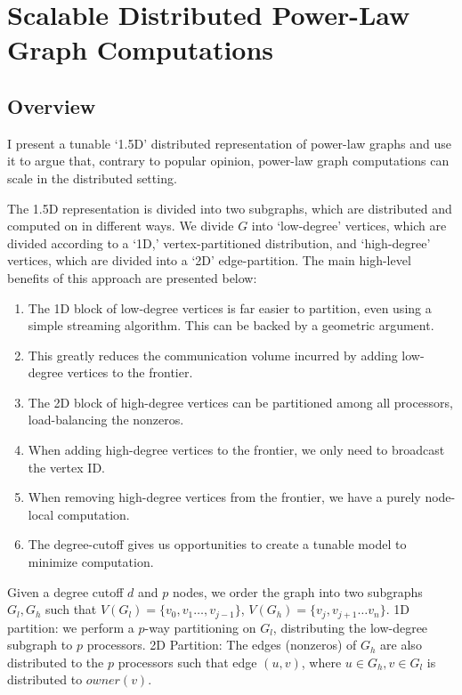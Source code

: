 \documentclass[11pt]{article}
\begin{document}
\newpage \section{Scalable Distributed Power-Law Graph Computations}
\subsection{Overview}
 I present a tunable `1.5D' distributed representation of power-law graphs and use it to argue that, contrary to popular opinion, power-law graph computations can scale in the distributed setting.
 
The 1.5D representation is divided into two subgraphs, which are distributed and computed on in different ways. We divide $G$ into `low-degree' vertices, which are divided according to a `1D,' vertex-partitioned distribution, and `high-degree' vertices, which are divided into a `2D' edge-partition. The main high-level benefits of this approach are presented below:

\begin{enumerate}
\item The 1D block of low-degree vertices is far easier to partition, even using a simple streaming algorithm. This can be backed by a geometric argument. 
\item This greatly reduces the communication volume incurred by adding low-degree vertices to the frontier.
\item The 2D block of high-degree vertices can be partitioned among all processors, load-balancing the nonzeros.
\item When adding high-degree vertices to the frontier, we only need to broadcast the vertex ID. 
\item When removing high-degree vertices from the frontier, we have a purely node-local computation.
\item The degree-cutoff gives us opportunities to create a tunable model to minimize computation.
\end{enumerate}

Given a degree cutoff $d$ and $p$ nodes, we order the graph into two subgraphs $G_l, G_h$ such that $V(G_l) = \{v_0, v_1 \dots, v_{j-1}\}$, $V(G_h) = \{v_j, v_{j+1} \dots v_n\}$. 1D partition: we perform a $p$-way partitioning on $G_l$,  distributing the low-degree subgraph to $p$ processors. 2D Partition: The edges (nonzeros) of $G_h$ are also distributed to the $p$ processors such that edge $(u,v)$, where $u \in G_h, v \in G_l$ is distributed to $owner(v)$. 
\end{document}
